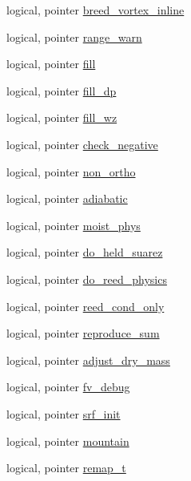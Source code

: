 \begin{DoxyCompactItemize}
logical, pointer \hyperlink{classfv__control__mod_a693fa8e76b528190da7bbc9a93a4f052}{breed\-\_\-vortex\-\_\-inline}
\item 
logical, pointer \hyperlink{classfv__control__mod_a1ebd288b513de31ca3790fd7b5ae49b3}{range\-\_\-warn}
\item 
logical, pointer \hyperlink{classfv__control__mod_a1c8e563dc793a7a9fdb217086386f370}{fill}
\item 
logical, pointer \hyperlink{classfv__control__mod_a0ef8552f4ff8792c17eeff1b212dad52}{fill\-\_\-dp}
\item 
logical, pointer \hyperlink{classfv__control__mod_a66f62df44cc9f1d8bae9a60868742934}{fill\-\_\-wz}
\item 
logical, pointer \hyperlink{classfv__control__mod_aa2e1b1eb3fdd42425c13c76b8d1fe939}{check\-\_\-negative}
\item 
logical, pointer \hyperlink{classfv__control__mod_a43435c908837a24797feeda4b6299c85}{non\-\_\-ortho}
\item 
logical, pointer \hyperlink{classfv__control__mod_a6b2b6dac1b995dba9bc0470a45b90c7f}{adiabatic}
\item 
logical, pointer \hyperlink{classfv__control__mod_ac0a394d19dca47dbadf863da0f8237c5}{moist\-\_\-phys}
\item 
logical, pointer \hyperlink{classfv__control__mod_aa8f21329b0315f3270ade9d6ea2d6e40}{do\-\_\-held\-\_\-suarez}
\item 
logical, pointer \hyperlink{classfv__control__mod_aaba0a316e4944159dc4c88724d3058cb}{do\-\_\-reed\-\_\-physics}
\item 
logical, pointer \hyperlink{classfv__control__mod_a2b3d0562dc8b3bf11a64ed364e054869}{reed\-\_\-cond\-\_\-only}
\item 
logical, pointer \hyperlink{classfv__control__mod_a668baeb813fce15e439934c6a8fb6ea1}{reproduce\-\_\-sum}
\item 
logical, pointer \hyperlink{classfv__control__mod_a165574794aaa021231e7c00d7d200419}{adjust\-\_\-dry\-\_\-mass}
\item 
logical, pointer \hyperlink{classfv__control__mod_a7c3504459e1540c0d6360d992b484fda}{fv\-\_\-debug}
\item 
logical, pointer \hyperlink{classfv__control__mod_a32fd358d603e9d36b2d892f598819878}{srf\-\_\-init}
\item 
logical, pointer \hyperlink{classfv__control__mod_a4491cd64caa35ee066a3a6a22331c33b}{mountain}
\item 
logical, pointer \hyperlink{classfv__control__mod_a8bef0383195e3a490e60402a03274b8a}{remap\-\_\-t}

\end{DoxyCompactItemize}
